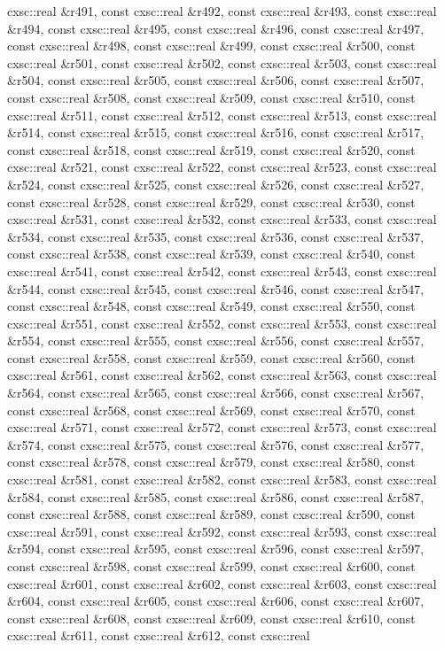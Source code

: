 \begin{DoxyCompactItemize}
cxsc\-::real \&r491, const cxsc\-::real \&r492, const cxsc\-::real \&r493, const cxsc\-::real \&r494, const cxsc\-::real \&r495, const cxsc\-::real \&r496, const cxsc\-::real \&r497, const cxsc\-::real \&r498, const cxsc\-::real \&r499, const cxsc\-::real \&r500, const cxsc\-::real \&r501, const cxsc\-::real \&r502, const cxsc\-::real \&r503, const cxsc\-::real \&r504, const cxsc\-::real \&r505, const cxsc\-::real \&r506, const cxsc\-::real \&r507, const cxsc\-::real \&r508, const cxsc\-::real \&r509, const cxsc\-::real \&r510, const cxsc\-::real \&r511, const cxsc\-::real \&r512, const cxsc\-::real \&r513, const cxsc\-::real \&r514, const cxsc\-::real \&r515, const cxsc\-::real \&r516, const cxsc\-::real \&r517, const cxsc\-::real \&r518, const cxsc\-::real \&r519, const cxsc\-::real \&r520, const cxsc\-::real \&r521, const cxsc\-::real \&r522, const cxsc\-::real \&r523, const cxsc\-::real \&r524, const cxsc\-::real \&r525, const cxsc\-::real \&r526, const cxsc\-::real \&r527, const cxsc\-::real \&r528, const cxsc\-::real \&r529, const cxsc\-::real \&r530, const cxsc\-::real \&r531, const cxsc\-::real \&r532, const cxsc\-::real \&r533, const cxsc\-::real \&r534, const cxsc\-::real \&r535, const cxsc\-::real \&r536, const cxsc\-::real \&r537, const cxsc\-::real \&r538, const cxsc\-::real \&r539, const cxsc\-::real \&r540, const cxsc\-::real \&r541, const cxsc\-::real \&r542, const cxsc\-::real \&r543, const cxsc\-::real \&r544, const cxsc\-::real \&r545, const cxsc\-::real \&r546, const cxsc\-::real \&r547, const cxsc\-::real \&r548, const cxsc\-::real \&r549, const cxsc\-::real \&r550, const cxsc\-::real \&r551, const cxsc\-::real \&r552, const cxsc\-::real \&r553, const cxsc\-::real \&r554, const cxsc\-::real \&r555, const cxsc\-::real \&r556, const cxsc\-::real \&r557, const cxsc\-::real \&r558, const cxsc\-::real \&r559, const cxsc\-::real \&r560, const cxsc\-::real \&r561, const cxsc\-::real \&r562, const cxsc\-::real \&r563, const cxsc\-::real \&r564, const cxsc\-::real \&r565, const cxsc\-::real \&r566, const cxsc\-::real \&r567, const cxsc\-::real \&r568, const cxsc\-::real \&r569, const cxsc\-::real \&r570, const cxsc\-::real \&r571, const cxsc\-::real \&r572, const cxsc\-::real \&r573, const cxsc\-::real \&r574, const cxsc\-::real \&r575, const cxsc\-::real \&r576, const cxsc\-::real \&r577, const cxsc\-::real \&r578, const cxsc\-::real \&r579, const cxsc\-::real \&r580, const cxsc\-::real \&r581, const cxsc\-::real \&r582, const cxsc\-::real \&r583, const cxsc\-::real \&r584, const cxsc\-::real \&r585, const cxsc\-::real \&r586, const cxsc\-::real \&r587, const cxsc\-::real \&r588, const cxsc\-::real \&r589, const cxsc\-::real \&r590, const cxsc\-::real \&r591, const cxsc\-::real \&r592, const cxsc\-::real \&r593, const cxsc\-::real \&r594, const cxsc\-::real \&r595, const cxsc\-::real \&r596, const cxsc\-::real \&r597, const cxsc\-::real \&r598, const cxsc\-::real \&r599, const cxsc\-::real \&r600, const cxsc\-::real \&r601, const cxsc\-::real \&r602, const cxsc\-::real \&r603, const cxsc\-::real \&r604, const cxsc\-::real \&r605, const cxsc\-::real \&r606, const cxsc\-::real \&r607, const cxsc\-::real \&r608, const cxsc\-::real \&r609, const cxsc\-::real \&r610, const cxsc\-::real \&r611, const cxsc\-::real \&r612, const cxsc\-::real 
\end{DoxyCompactItemize}

